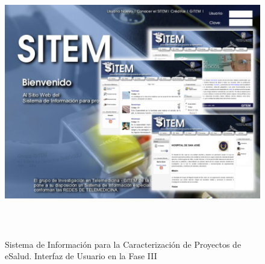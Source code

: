 \begin{figure}
 \centering
 \includegraphics[width=156mm, height=118mm]{pagina_principal.png}
 \caption{Sistema de Información para la Caracterización de Proyectos de eSalud. Interfaz de Usuario en la Fase III}
 \label{sitem_faseIII}
\end{figure}